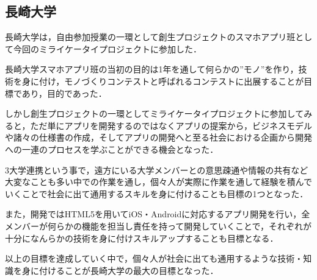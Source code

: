 \subsection{長崎大学}
\par
長崎大学は，自由参加授業の一環として創生プロジェクトのスマホアプリ班として今回のミライケータイプロジェクトに参加した．
\par
長崎大学スマホアプリ班の当初の目的は1年を通して何らかの”モノ”を作り，技術を身に付け，モノづくりコンテストと呼ばれるコンテストに出展することが目標であり，目的であった．
\par
しかし創生プロジェクトの一環としてミライケータイプロジェクトに参加してみると，ただ単にアプリを開発するのではなくアプリの提案から，ビジネスモデルや諸々の仕様書の作成，そしてアプリの開発へと至る社会における企画から開発への一連のプロセスを学ぶことができる機会となった．
\par
3大学連携という事で，遠方にいる大学メンバーとの意思疎通や情報の共有など大変なことも多い中での作業を通し，個々人が実際に作業を通して経験を積んでいくことで社会に出て通用するスキルを身に付けることも目標の1つとなった．
\par
また，開発ではHTML5を用いてiOS・Androidに対応するアプリ開発を行い，全メンバーが何らかの機能を担当し責任を持って開発していくことで，それぞれが十分になんらかの技術を身に付けスキルアップすることも目標となる．
\par
以上の目標を達成していく中で，個々人が社会に出ても通用するような技術・知識を身に付けることが長崎大学の最大の目標となった．
